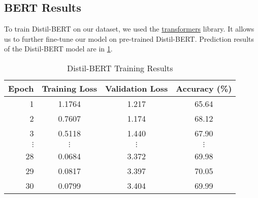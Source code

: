 \subsection{BERT Results}
To train Distil-BERT on our dataset, we used the \href{https://huggingface.co/docs/transformers/index}{transformers} library. It allows us to further fine-tune our model on pre-trained Distil-BERT\@. Prediction results of the Distil-BERT model are in \cref{table:bert_results}.
\begin{table}[ht]
    \centering
    \caption{Distil-BERT Training Results}\label{table:bert_results}
    \begin{tabular}{rccc}\toprule
        \textbf{Epoch} & \textbf{Training Loss} & \textbf{Validation Loss} & \textbf{Accuracy (\%)} \\ \midrule
        1              & 1.1764                 & 1.217                    & 65.64                  \\
        2              & 0.7607                 & 1.174                    & 68.12                  \\
        3              & 0.5118                 & 1.440                    & 67.90                  \\
        \(\vdots \)    & \(\vdots \)            & \(\vdots \)              & \(\vdots \)            \\
        28             & 0.0684                 & 3.372                    & 69.98                  \\
        29             & 0.0817                 & 3.397                    & 70.05                  \\
        30             & 0.0799                 & 3.404                    & 69.99                  \\ \bottomrule
    \end{tabular}
\end{table}
